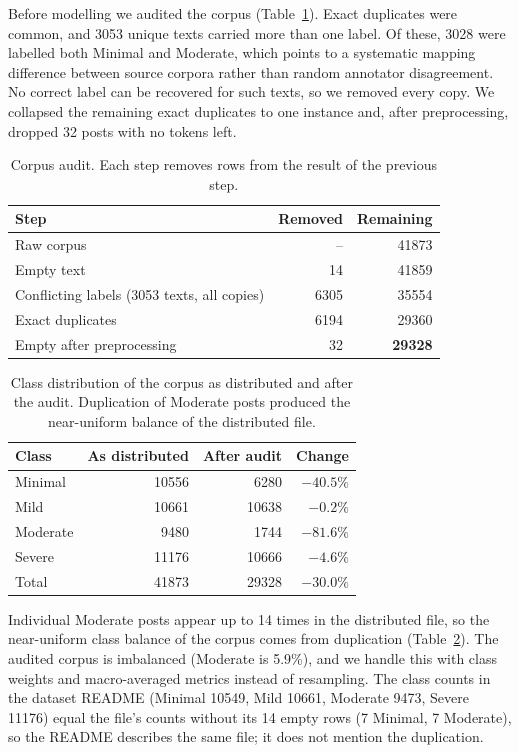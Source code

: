 \documentclass[conference]{IEEEtran}
\begin{document}
Before modelling we audited the corpus (Table~\ref{tab:audit}). Exact duplicates were common, and \num{3053} unique texts carried more than one label. Of these, \num{3028} were labelled both Minimal and Moderate, which points to a systematic mapping difference between source corpora rather than random annotator disagreement. No correct label can be recovered for such texts, so we removed every copy. We collapsed the remaining exact duplicates to one instance and, after preprocessing, dropped 32 posts with no tokens left.

\begin{table}[!htbp]
\centering
\caption{Corpus audit. Each step removes rows from the result of the previous step.}
\label{tab:audit}
\begin{tabular}{lrr}
\toprule
Step & Removed & Remaining \\
\midrule
Raw corpus & -- & \num{41873} \\
Empty text & 14 & \num{41859} \\
Conflicting labels (\num{3053} texts, all copies) & \num{6305} & \num{35554} \\
Exact duplicates & \num{6194} & \num{29360} \\
Empty after preprocessing & 32 & \textbf{\num{29328}} \\
\bottomrule
\end{tabular}
\end{table}

\begin{table}[!htbp]
\centering
\caption{Class distribution of the corpus as distributed and after the audit. Duplication of Moderate posts produced the near-uniform balance of the distributed file.}
\label{tab:classes}
\begin{tabular}{lrrr}
\toprule
Class & As distributed & After audit & Change \\
\midrule
Minimal  & \num{10556} & \num{6280}  & $-40.5\%$ \\
Mild     & \num{10661} & \num{10638} & $-0.2\%$ \\
Moderate & \num{9480}  & \num{1744}  & $-81.6\%$ \\
Severe   & \num{11176} & \num{10666} & $-4.6\%$ \\
\midrule
Total    & \num{41873} & \num{29328} & $-30.0\%$ \\
\bottomrule
\end{tabular}
\end{table}

Individual Moderate posts appear up to 14 times in the distributed file, so the near-uniform class balance of the corpus comes from duplication (Table~\ref{tab:classes}). The audited corpus is imbalanced (Moderate is 5.9\%), and we handle this with class weights and macro-averaged metrics instead of resampling. The class counts in the dataset README (Minimal \num{10549}, Mild \num{10661}, Moderate \num{9473}, Severe \num{11176}) equal the file's counts without its 14 empty rows (7 Minimal, 7 Moderate), so the README describes the same file; it does not mention the duplication.
\end{document}
